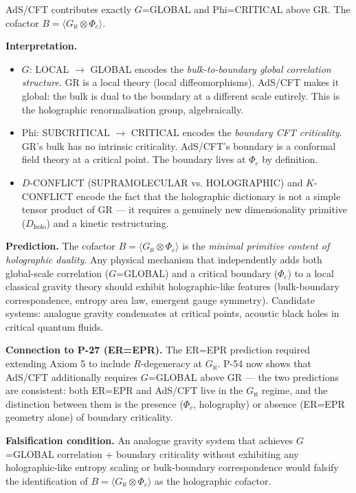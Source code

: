 \documentclass[12pt,a4paper]{article}
\begin{document}
AdS/CFT contributes exactly $G$=GLOBAL and Phi=CRITICAL above GR. The cofactor $B = \langle G_\aleph \otimes \Phi_c \rangle$.

\textbf{Interpretation.}

\begin{itemize}
    \item $G$: LOCAL $\rightarrow$ GLOBAL encodes the \emph{bulk-to-boundary global correlation structure}. GR is a local theory (local diffeomorphisms). AdS/CFT makes it global: the bulk is dual to the boundary at a different scale entirely. This is the holographic renormalisation group, algebraically.
    \item Phi: SUBCRITICAL $\rightarrow$ CRITICAL encodes the \emph{boundary CFT criticality}. GR's bulk has no intrinsic criticality. AdS/CFT's boundary is a conformal field theory at a critical point. The boundary lives at $\Phi_c$ by definition.
    \item $D$-CONFLICT (SUPRAMOLECULAR vs. HOLOGRAPHIC) and $K$-CONFLICT encode the fact that the holographic dictionary is not a simple tensor product of GR --- it requires a genuinely new dimensionality primitive ($D_\text{holo}$) and a kinetic restructuring.
\end{itemize}

\textbf{Prediction.} The cofactor $B = \langle G_\aleph \otimes \Phi_c \rangle$ is the \emph{minimal primitive content of holographic duality}. Any physical mechanism that independently adds both global-scale correlation ($G$=GLOBAL) and a critical boundary ($\Phi_c$) to a local classical gravity theory should exhibit holographic-like features (bulk-boundary correspondence, entropy area law, emergent gauge symmetry). Candidate systems: analogue gravity condensates at critical points, acoustic black holes in critical quantum fluids.

\textbf{Connection to P-27 (ER=EPR).} The ER=EPR prediction required extending Axiom 5 to include $R$-degeneracy at $G_\aleph$. P-54 now shows that AdS/CFT additionally requires $G$=GLOBAL above GR --- the two predictions are consistent: both ER=EPR and AdS/CFT live in the $G_\aleph$ regime, and the distinction between them is the presence ($\Phi_c$, holography) or absence (ER=EPR geometry alone) of boundary criticality.

\textbf{Falsification condition.} An analogue gravity system that achieves $G$=GLOBAL correlation + boundary criticality without exhibiting any holographic-like entropy scaling or bulk-boundary correspondence would falsify the identification of $B = \langle G_\aleph \otimes \Phi_c \rangle$ as the holographic cofactor.
\end{document}
